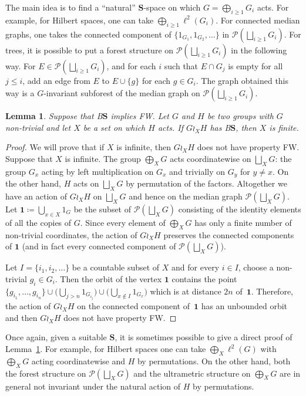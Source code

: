 \documentclass[a4paper]{article}
\newtheorem{lem}{Lemma}[section]
\theoremstyle{definition}
\newcommand*{\BS}{B$\mathbf{S}$}
\newcommand*{\powerset}[1]{\mathcal P(#1)}
\begin{document}
The main idea is to find a ``natural'' $\mathbf S$-space on which $G=\bigoplus_{i\geq 1}G_i$ acts. For example, for Hilbert spaces, one can take $\bigoplus_{i\geq 1}\ell^2(G_i)$. For connected median graphs, one takes the connected component of $\{1_{G_1},1_{G_2},\dots\}$ in $\powerset{\bigsqcup_{i\geq 1} G_i}$.
For trees, it is possible to put a forest structure on $\powerset{\bigsqcup_{i\geq 1} G_i}$ in the following way.
For $E\in\powerset{\bigsqcup_{i\geq 1} G_i}$, and for each $i$ such that $E\cap G_j$ is empty for all $j\leq i$, add an edge from $E$ to $E\cup\{g\}$ for each $g\in G_i$. The graph obtained this way is a $G$-invariant subforest of the median graph on $\powerset{\bigsqcup_{i\geq 1} G_i}$.
%
%
\begin{lem}\label{Lemma:XFinite}
Suppose that \BS{} implies FW.
Let $G$ and $H$ be two groups with $G$ non-trivial and let $X$ be a set on which $H$ acts.
If $G\wr_XH$ has \BS, then $X$ is finite.
\end{lem}
\begin{proof}
We will prove that if $X$ is infinite, then $G\wr_XH$ does not have property FW. Suppose that $X$ is infinite.
The group $\bigoplus_XG$ acts coordinatewise on  $\bigsqcup_XG$: the group $G_x$ acting by left multiplication on $G_x$ and trivially on $G_y$ for $y\neq x$. On the other hand, $H$ acts on $\bigsqcup_XG$ by permutation of the factors.
Altogether we have an action of $G\wr_XH$ on $\bigsqcup_XG$ and hence on the median graph $\powerset{\bigsqcup_XG}$.
Let $\mathbf 1\coloneqq\bigcup_{x\in X} 1_{G}$ be the subset of $\powerset{\bigsqcup_XG}$ consisting of the identity elements of all the copies of $G$.
Since every element of $\bigoplus_XG$ has only a finite number of non-trivial coordinates, the action of $G\wr_XH$ preserves the connected components of $\mathbf 1$ (and in fact every connected component of $\powerset{\bigsqcup_XG}$).

Let $I=\{i_1,i_2,\dots\}$ be a countable subset of $X$ and for every $i\in I$, choose a non-trivial $g_i\in G_{i}$.
Then the orbit of the vertex $\mathbf 1$ contains the point $\{g_{i_1},\dots, g_{i_n}\}\cup\bigl(\bigcup_{j>n} 1_{G_{i_j}}\bigr)\cup\bigl(\bigcup_{x\notin I} 1_{G_{x}}\bigr)$ which is at distance $2n$ of~$\mathbf 1$.
Therefore, the action of $G\wr_XH$ on the connected component of~$\mathbf 1$ has an unbounded orbit and then $G\wr_XH$ does not have property FW.
\end{proof}
%
%
Once again, given a suitable $\mathbf{S}$, it is sometimes possible to give a direct proof of Lemma~\ref{Lemma:XFinite}.
For example, for Hilbert spaces one can take $\bigoplus_X\ell^2(G)$ with $\bigoplus_XG$ acting coordinatewise and $H$ by permutations.
On the other hand, both the forest structure on $\powerset{\bigsqcup_XG}$ and the ultrametric structure on $\bigoplus_XG$ are in general not invariant under the natural action of $H$ by permutations.
\end{document}
